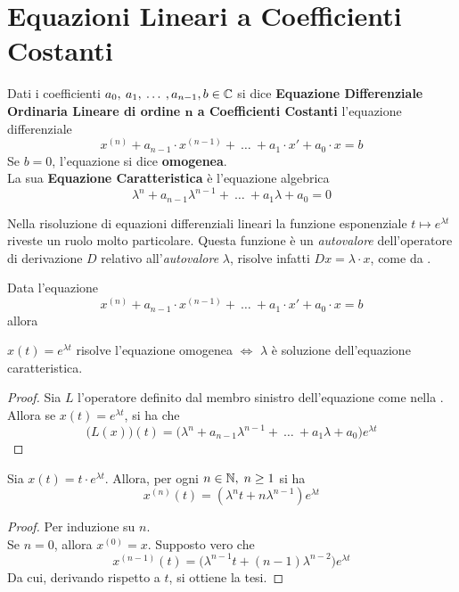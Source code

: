 \section{Equazioni Lineari a Coefficienti Costanti}
\begin{definition}
	Dati i coefficienti $a_0,\:a_1,\:\dotsc\:,a_{n-1},b \in \mathbb{C}$ si dice \textbf{Equazione Differenziale Ordinaria Lineare di ordine $\boldsymbol{n}$ a Coefficienti Costanti} l'equazione differenziale
	$$x^{(n)} + a_{n-1} \cdot x^{(n-1)} +\:\ldots\:+ a_1 \cdot x' + a_0 \cdot x = b$$
	Se $b=0$, l'equazione si dice \textbf{omogenea}.\\
	La sua \textbf{Equazione Caratteristica} è l'equazione algebrica
	$$\lambda^n + a_{n-1} \lambda^{n-1} +\:\ldots\:+ a_1 \lambda + a_0 = 0$$
\end{definition}
\begin{observation}
	Nella risoluzione di equazioni differenziali lineari la funzione esponenziale $t \mapsto e^{\lambda t}$ riveste un ruolo molto particolare. Questa funzione è un \textit{autovalore} dell'operatore di derivazione $D$ relativo all'\textit{autovalore} $\lambda$, risolve infatti $Dx=\lambda \cdot x$, come da .
\end{observation}
\begin{proposition}
	Data l'equazione
	$$x^{(n)} + a_{n-1} \cdot x^{(n-1)} +\:\ldots\:+ a_1 \cdot x'+a_0 \cdot x = b$$
	allora
	\begin{center}
		$x(t)=e^{\lambda t}$ risolve l'equazione omogenea $\iff$ $\lambda$ è soluzione dell'equazione caratteristica.
	\end{center}
	\begin{proof}
		Sia $L$ l'operatore definito dal membro sinistro dell'equazione come nella . Allora se $x(t) = e^{\lambda t}$, si ha che
		$$\bigl(L(x)\bigr)(t) = \bigl( \lambda^n + a_{n-1}\lambda^{n-1} +\:\ldots\:+ a_1 \lambda + a_0 \bigr) e^{\lambda t}$$
	\end{proof}
\end{proposition}
\begin{lemma}
	Sia $x(t)=t \cdot e^{\lambda t}$. Allora, per ogni $n\in\mathbb{N},\;n \geq 1$ si ha
	$$x^{(n)}(t)=\left(\lambda^nt+n\lambda^{n-1}\right) e^{\lambda t}$$
	\begin{proof}
		Per induzione su $n$.\\
		Se $n=0$, allora $x^{(0)} = x$. Supposto vero che
		$$x^{(n-1)}(t) = \bigl( \lambda^{n-1} t + (n-1) \lambda^{n-2} \bigr) e^{\lambda t}$$
		Da cui, derivando rispetto a $t$, si ottiene la tesi.
	\end{proof}
\end{lemma}
